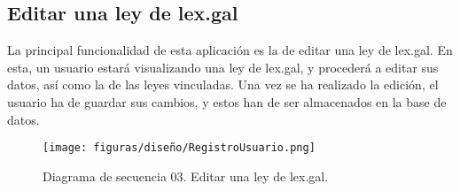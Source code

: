 \subsection{Editar una ley de lex.gal}

La principal funcionalidad de esta aplicación es la de editar una ley de lex.gal. En esta, un usuario estará visualizando una ley de lex.gal, y procederá a editar sus datos, así como la de las leyes vinculadas. Una vez se ha realizado la edición, el usuario ha de guardar sus cambios, y estos han de ser almacenados en la base de datos.

\begin{figure}[H]
\centerline{\texttt{[image: figuras/diseño/RegistroUsuario.png]}}
\caption{Diagrama de secuencia 03. Editar una ley de lex.gal.}
\label{enlaceDEditar}
\end{figure}